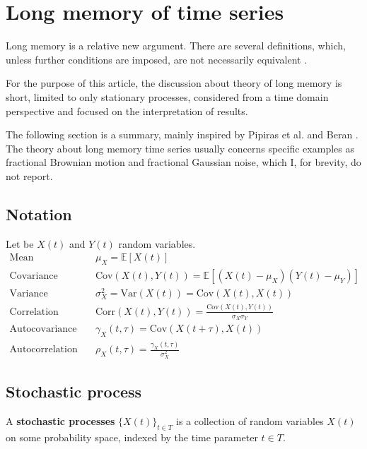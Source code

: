 \section{Long memory of time series}\label{sec:theory}
Long memory is a relative new argument. There are several definitions, which, unless further conditions are imposed, are not necessarily equivalent \cite{pipiras_taqqu_2017}.

For the purpose of this article, the discussion about theory of long memory is short, limited to only stationary processes, considered from a time domain perspective and focused on the interpretation of results.

The following section is a summary, mainly inspired by Pipiras et al. \cite{pipiras_taqqu_2017} and Beran \cite{Beran:2304008}. The theory about long memory time series usually concerns specific examples as fractional Brownian motion and fractional Gaussian noise, which I, for brevity, do not report.

\subsection{Notation}
Let be $X(t)$ and $Y(t)$ random variables.
\begin{align}
\text{Mean}\quad &\mu_X = \mathbb{E}[X(t)] \\
\text{Covariance}\quad &\text{Cov}(X(t), Y(t)) = \mathbb{E}[(X(t) - \mu_X)(Y(t) - \mu_Y)] \\
\text{Variance}\quad &\sigma^2_X = \text{Var}(X(t)) = \text{Cov}(X(t), X(t)) \\
\text{Correlation}\quad &\text{Corr}(X(t), Y(t)) = \frac{\text{Cov}(X(t), Y(t))}{\sigma_X  \sigma_Y } \\
\text{Autocovariance}\quad &\gamma_X(t, \tau) = \text{Cov}(X(t+\tau), X(t)) \\
\text{Autocorrelation}\quad &\rho_X(t, \tau) = \frac{\gamma_X(t, \tau)}{\sigma^2_X}
\end{align}

\subsection{Stochastic process}
\begin{definition}
	A \textbf{stochastic processes} $\{X(t)\}_{t \in T}$ is a collection of random variables $X(t)$ on some probability space, indexed by the time parameter $t \in T$.
\end{definition}

